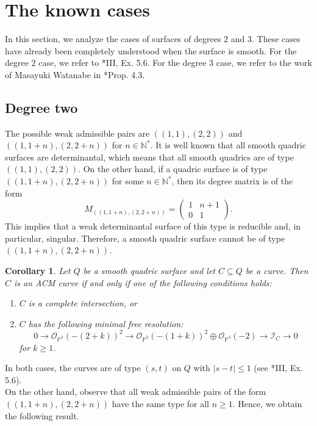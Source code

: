 \documentclass[12pt,reqno]{amsart}
\theoremstyle{plain}
\newtheorem{cor}[theorem]{Corollary}
\theoremstyle{definition}
\theoremstyle{remark}
\theoremstyle{definition}
\newcommand{\PP}{\mathds{P}}
\newcommand{\PPP}{\PP^{3}}
\newcommand{\ii}{\mathscr{I}}
\newcommand{\oo}{\mathcal{O}}
\begin{document}
\section{The known cases} \label{sec::2}

In this section, we analyze the cases of surfaces of degrees $2$ and $3$. These cases have already been completely understood when the surface is smooth. For the degree $2$ case, we refer to \cite{har2}*{III, Ex. 5.6}. For the degree $3$ case, we refer to the work of Masayuki Watanabe in \cite{mwa}*{Prop. 4.3}.

\subsection{Degree two}

The possible weak admissible pairs are $((1,1),(2,2))$ and $((1,1+n),(2,2+n))$ for $n\in\mathds{N}^{*}$. It is well known that all smooth quadric surfaces are determinantal, which means that all smooth quadrics are of type $((1,1),(2,2))$. On the other hand, if a quadric surface is of type $((1,1+n),(2,2+n))$ for some $n\in\mathds{N}^{*}$, then its degree matrix is of the form
\[
M_{((1,1+n),(2,2+n))}=
\begin{pmatrix}
1 & n+1\\
0 & 1
\end{pmatrix}.
\]
This implies that a weak determinantal surface of this type is reducible and, in particular, singular. Therefore, a smooth quadric surface cannot be of type $((1,1+n),(2,2+n))$.

\begin{cor}
Let $Q$ be a smooth quadric surface and let $C\subseteq Q$ be a curve. Then $C$ is an ACM curve if and only if one of the following conditions holds:
\begin{enumerate}
\item $C$ is a complete intersection, or
\item $C$ has the following minimal free resolution:
\[
0\to \oo_{\PPP}(-(2+k))^{2}\to \oo_{\PPP}(-(1+k))^{2}\oplus \oo_{\PPP}(-2)\to \ii_{C}\to 0
\]
for $k\geq 1$.
\end{enumerate}
\end{cor}

In both cases, the curves are of type $(s,t)$ on $Q$ with $|s-t|\leq 1$ (see \cite{har2}*{III, Ex. 5.6}).\\

On the other hand, observe that all weak admissible pairs of the form $((1,1+n),(2,2+n))$ have the same type for all $n\geq 1$. Hence, we obtain the following result.
\end{document}
